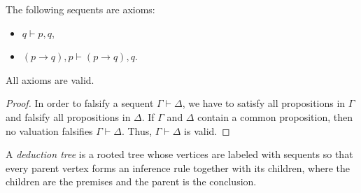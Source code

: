 \begin{page}
\setcounter{section}{2}
\setcounter{subsection}{5}
\setcounter{dfn}{11}
\label{portion:516}

\begin{exl}
The following sequents are axioms:
\begin{itemize}
\item $q \vdash p, q$,
\item $(p \to q), p \vdash (p \to q), q$.
\end{itemize}
\end{exl}

\end{page}

\begin{page}
\setcounter{section}{2}
\setcounter{subsection}{5}
\setcounter{dfn}{12}
\label{portion:519}

\begin{lem}
\label{lem:AxiomValid}
All axioms are valid.
\end{lem}

\end{page}

\begin{page}
\setcounter{section}{2}
\setcounter{subsection}{5}
\setcounter{dfn}{12}
\label{portion:520}

\begin{proof}
In order to falsify a sequent $\Gamma \vdash \Delta$, we have to satisfy all propositions in $\Gamma$ and falsify all propositions in $\Delta$.
If $\Gamma$ and $\Delta$ contain a common proposition, then no valuation falsifies $\Gamma \vdash \Delta$.
Thus, $\Gamma \vdash \Delta$ is valid.
\end{proof}


\end{page}

\begin{page}
\setcounter{section}{2}
\setcounter{subsection}{5}
\setcounter{dfn}{13}
\label{portion:522}

\begin{dfn}
\label{dfn:DeductionTree}
A \emph{deduction tree} is a rooted tree whose vertices are labeled with sequents so that
every parent vertex forms an inference rule together with its children, where the children are the premises and the parent is the conclusion.
\end{dfn}

\end{page}

